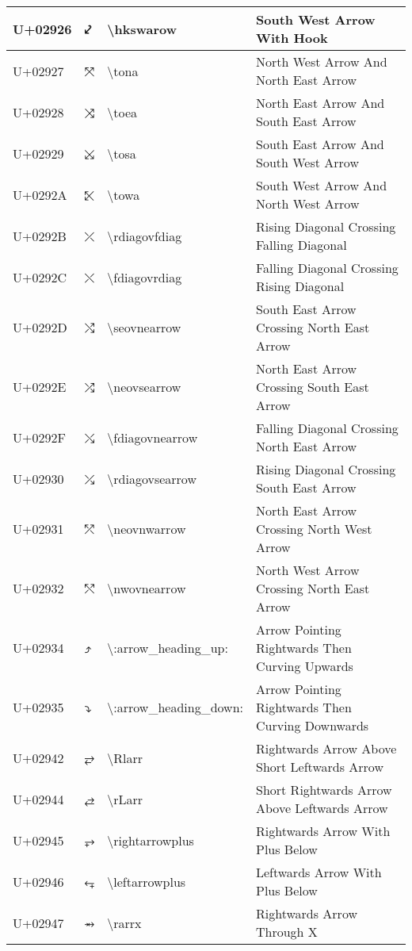 \begin{table}[h]
\begin{tabulary}{\linewidth}{|L|L|L|L|}
\hline
U+02926 & ⤦ & {\textbackslash}hkswarow & South West Arrow With Hook \\
\hline
U+02927 & ⤧ & {\textbackslash}tona & North West Arrow And North East Arrow \\
\hline
U+02928 & ⤨ & {\textbackslash}toea & North East Arrow And South East Arrow \\
\hline
U+02929 & ⤩ & {\textbackslash}tosa & South East Arrow And South West Arrow \\
\hline
U+0292A & ⤪ & {\textbackslash}towa & South West Arrow And North West Arrow \\
\hline
U+0292B & ⤫ & {\textbackslash}rdiagovfdiag & Rising Diagonal Crossing Falling Diagonal \\
\hline
U+0292C & ⤬ & {\textbackslash}fdiagovrdiag & Falling Diagonal Crossing Rising Diagonal \\
\hline
U+0292D & ⤭ & {\textbackslash}seovnearrow & South East Arrow Crossing North East Arrow \\
\hline
U+0292E & ⤮ & {\textbackslash}neovsearrow & North East Arrow Crossing South East Arrow \\
\hline
U+0292F & ⤯ & {\textbackslash}fdiagovnearrow & Falling Diagonal Crossing North East Arrow \\
\hline
U+02930 & ⤰ & {\textbackslash}rdiagovsearrow & Rising Diagonal Crossing South East Arrow \\
\hline
U+02931 & ⤱ & {\textbackslash}neovnwarrow & North East Arrow Crossing North West Arrow \\
\hline
U+02932 & ⤲ & {\textbackslash}nwovnearrow & North West Arrow Crossing North East Arrow \\
\hline
U+02934 & ⤴ & {\textbackslash}:arrow\_heading\_up: & Arrow Pointing Rightwards Then Curving Upwards \\
\hline
U+02935 & ⤵ & {\textbackslash}:arrow\_heading\_down: & Arrow Pointing Rightwards Then Curving Downwards \\
\hline
U+02942 & ⥂ & {\textbackslash}Rlarr & Rightwards Arrow Above Short Leftwards Arrow \\
\hline
U+02944 & ⥄ & {\textbackslash}rLarr & Short Rightwards Arrow Above Leftwards Arrow \\
\hline
U+02945 & ⥅ & {\textbackslash}rightarrowplus & Rightwards Arrow With Plus Below \\
\hline
U+02946 & ⥆ & {\textbackslash}leftarrowplus & Leftwards Arrow With Plus Below \\
\hline
U+02947 & ⥇ & {\textbackslash}rarrx & Rightwards Arrow Through X \\

\end{tabulary}
\end{table}
